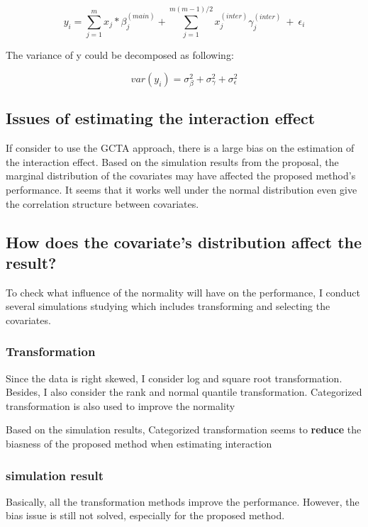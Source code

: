\documentclass[]{article}
\begin{document}
\[
  y_i = \sum^m_{j = 1}x_j*\beta^{(main)}_j + \sum^{m(m-1)/2}_{j=1}x^{(inter)}_j\gamma^{(inter)}_j ~+~ \epsilon_i
\]

The variance of y could be decomposed as following:

\[
  var(y_i) = \sigma^2_{\beta} + \sigma^2_{\gamma} + \sigma^2_{\epsilon}
\]

\subsection{Issues of estimating the interaction
effect}\label{issues-of-estimating-the-interaction-effect}

If consider to use the GCTA approach, there is a large bias on the
estimation of the interaction effect. Based on the simulation results
from the proposal, the marginal distribution of the covariates may have
affected the proposed method's performance. It seems that it works well
under the normal distribution even give the correlation structure
between covariates.

\subsection{How does the covariate's distribution affect the
result?}\label{how-does-the-covariates-distribution-affect-the-result}

To check what influence of the normality will have on the performance, I
conduct several simulations studying which includes transforming and
selecting the covariates.

\subsubsection{Transformation}\label{transformation}

Since the data is right skewed, I consider log and square root
transformation. Besides, I also consider the rank and normal quantile
transformation. Categorized transformation is also used to improve the
normality

Based on the simulation results, Categorized transformation seems to
\textbf{reduce} the biasness of the proposed method when estimating
interaction

\subsubsection{simulation result}\label{simulation-result}

Basically, all the transformation methods improve the performance.
However, the bias issue is still not solved, especially for the proposed
method.
\end{document}
